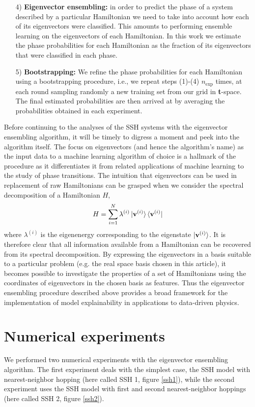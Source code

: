 \documentclass[10pt]{revtex4-1}
\begin{document}
\begin{enumerate}
\item[4)]\textbf{Eigenvector ensembling:} in order to predict the phase of a system described by a particular Hamiltonian we need to take into account how each of its eigenvectors were classified. This amounts to performing ensemble learning on the eigenvectors of each Hamiltonian. In this work we estimate the phase probabilities for each Hamiltonian as the fraction of its eigenvectors that were classified in each phase.
\item[5)] \textbf{Bootstrapping:} We refine the phase probabilities for each Hamiltonian using a bootstrapping procedure, i.e., we repeat steps (1)-(4) $n_\text{exp}$ times, at each round sampling randomly a new training set from our grid in \textbf{t}-space. The final estimated probabilities are then arrived at by averaging the probabilities obtained in each experiment.
\end{enumerate} 

\vspace{.3cm}
Before continuing to the analyses of the SSH systems with the eigenvector ensembling algorithm, it will be timely to digress a moment and peek into the algorithm itself. The focus on eigenvectors (and hence the algorithm's name) as the input data to a machine learning algorithm of choice is a hallmark of the procedure as it differentiates it from related applications of machine learning to the study of phase transitions. The intuition that eigenvectors can be used in replacement of raw Hamiltonians can be grasped when we consider the spectral decomposition of a Hamiltonian $H$,    
\begin{equation}
\label{eigen_decomposition}
H = \sum_{i=1}^{N}\lambda^{(i)} \ket{\mathbf{v}^{(i)}}\bra{\mathbf{v}^{(i)}}
\end{equation}
where $\lambda^{(i)}$ is the eigenenergy corresponding to the eigenstate $\ket{\mathbf{v}^{(i)}}$. It is therefore clear that all information available from a Hamiltonian can be recovered from its spectral decomposition. By expressing the eigenvectors in a basis suitable to a particular problem (e.g. the real space basis chosen in this article), it becomes possible to investigate the properties of a set of Hamiltonians using the coordinates of eigenvectors in the chosen basis as features. Thus the eigenvector ensembling procedure described above provides a broad framework for the implementation of model explainability in applications to data-driven physics. 

\section{Numerical experiments}
\label{numerical_experiments}
We performed two numerical experiments with the eigenvector ensembling algorithm. The first experiment deals with the simplest case, the SSH model with nearest-neighbor hopping (here called SSH 1, figure \ref{ssh1}), while the second experiment uses the SSH model with first and second nearest-neighbor hoppings (here called SSH 2, figure \ref{ssh2}).
\end{document}
